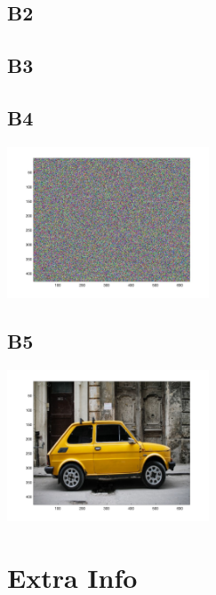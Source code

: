\documentclass[12pt, letterpaper, titlepage, hidelinks]{article}
\begin{document}
		\subsection{B2}

		\subsection{B3}

		\subsection{B4}
			\includegraphics[width=0.45\textwidth]{encrypted_image}
		\subsection{B5}
			\includegraphics[width=0.45\textwidth]{decrypted_image}

\section{Extra Info}
	
\end{document}
